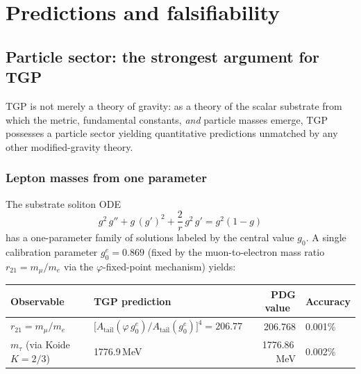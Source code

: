 
\section{Predictions and falsifiability}\label{sec:predictions}

\subsection{Particle sector: the strongest argument for TGP}%
\label{ssec:particle-sector}

TGP is not merely a theory of gravity: as a theory of the scalar
substrate from which the metric, fundamental constants, \emph{and}
particle masses emerge, TGP possesses a particle sector yielding
quantitative predictions unmatched by any other modified-gravity
theory.

\subsubsection{Lepton masses from one parameter}

The substrate soliton ODE
\begin{equation}\label{eq:soliton-ode}
  g^{2}\,g'' + g\,(g')^{2} + \frac{2}{r}\,g^{2}\,g' = g^{2}(1-g)
\end{equation}
has a one-parameter family of solutions labeled by the central
value $g_{0}$.  A single calibration parameter $g_{0}^{e}=0.869$
(fixed by the muon-to-electron mass ratio $r_{21}=m_{\mu}/m_{e}$
via the $\varphi$-fixed-point mechanism) yields:

\begin{center}\small
\begin{tabular}{@{}llrl@{}}
\toprule
\textbf{Observable} & \textbf{TGP prediction} &
\textbf{PDG value}~\cite{PDG2024} & \textbf{Accuracy} \\
\midrule
$r_{21} = m_{\mu}/m_{e}$
  & $\bigl[A_{\mathrm{tail}}(\varphi\,g_{0}^{e})/A_{\mathrm{tail}}(g_{0}^{e})\bigr]^{4} = 206.77$
  & 206.768
  & 0.001\% \\[4pt]
$m_{\tau}$ (via Koide $K=2/3$)
  & 1776.9\,MeV
  & 1776.86\,MeV
  & 0.002\% \\
\bottomrule
\end{tabular}
\end{center}

